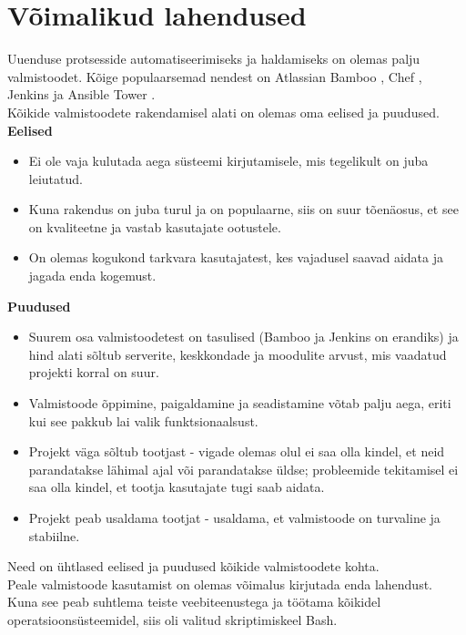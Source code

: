 \documentclass[12pt]{report}
\begin{document}
  \newpage
  
  \section{Võimalikud lahendused}
  
  Uuenduse protsesside automatiseerimiseks ja haldamiseks on olemas palju valmistoodet. Kõige populaarsemad nendest on Atlassian Bamboo \cite{bamboo}, Chef \cite{chef}, Jenkins \cite{jenkins} ja Ansible Tower \cite{ansible}.\\
  
  Kõikide valmistoodete rakendamisel alati on olemas oma eelised ja puudused.\\
  
  \textbf{Eelised}
  \begin{itemize}
    \item Ei ole vaja kulutada aega süsteemi kirjutamisele, mis tegelikult on juba leiutatud.
    \item Kuna rakendus on juba turul ja on populaarne, siis on suur tõenäosus, et see on kvaliteetne ja vastab kasutajate ootustele.
    \item On olemas kogukond tarkvara kasutajatest, kes vajadusel saavad aidata ja jagada enda kogemust.
  \end{itemize}
  
  \textbf{Puudused}
  \begin{itemize}
    \item Suurem osa valmistoodetest on tasulised (Bamboo ja Jenkins on erandiks) ja hind alati sõltub serverite, keskkondade ja moodulite arvust, mis vaadatud projekti korral on suur.
    \item Valmistoode õppimine, paigaldamine ja seadistamine võtab palju aega, eriti kui see pakkub lai valik funktsionaalsust.
    \item Projekt väga sõltub tootjast \-- vigade olemas olul ei saa olla kindel, et neid parandatakse lähimal ajal või parandatakse üldse; probleemide tekitamisel ei saa olla kindel, et tootja kasutajate tugi saab aidata.
    \item Projekt peab usaldama tootjat \-- usaldama, et valmistoode on turvaline ja stabiilne.
  \end{itemize}
  
  Need on ühtlased eelised ja puudused kõikide valmistoodete kohta.\\
  
  Peale valmistoode kasutamist on olemas võimalus kirjutada enda lahendust. Kuna see peab suhtlema teiste veebiteenustega ja töötama kõikidel operatsioonsüsteemidel, siis oli valitud skriptimiskeel Bash.\\
  
\end{document}
